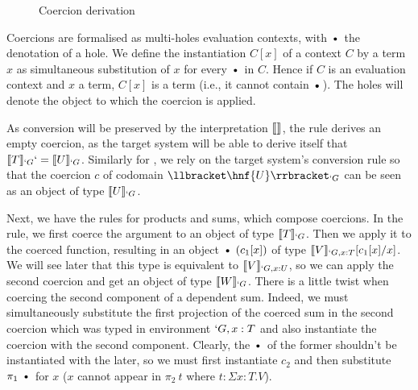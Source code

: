 \documentclass{llncs}
\begin{document}
\begin{figure}[ht]
  \subtisc
  \caption{Coercion derivation}
  \label{fig:coerce-impl-rules-short}
\end{figure}

Coercions are formalised as multi-holes evaluation contexts, with
$\ctxdot$ the denotation of a hole. We define the instantiation $C[x]$ of a context $C$
by a term $x$ as simultaneous substitution of $x$ for every $\ctxdot$ in $C$.
Hence if $C$ is an evaluation context and $x$ a term, $C[x]$ is a term
(i.e., it cannot contain $\ctxdot$).
The holes will denote the object to which the coercion is applied.

As conversion will be preserved by the interpretation $\llbracket  \rrbracket_{}$,
the rule  derives an empty coercion, as the target system
will be able to derive itself that $\llbracket T \rrbracket_{`G} `= \llbracket U \rrbracket_{`G}$.
Similarly for , we rely on the target system's conversion
rule so that the coercion $c$ of codomain $\ip{\hnf{U}}{`G}$ can be seen
as an object of type $\llbracket U \rrbracket_{`G}$.

Next, we have the rules for products and sums, which compose
coercions. In the  rule, we first coerce the argument to
an object of type $\llbracket T \rrbracket_{`G}$. Then we apply it to the coerced
function, resulting in an object $\ctxdot~(c_1[x])$ of type
$\llbracket V \rrbracket_{`G, x : T}[c_1[x]/x]$. We will see later that this type is equivalent to
$\llbracket V \rrbracket_{`G, x : U}$, so we can apply the second coercion and get an
object of type $\llbracket W \rrbracket_{`G}$. There is a little twist when coercing the
second component of a dependent sum. Indeed, we must simultaneously
substitute the first projection of the coerced sum in the second
coercion which was typed in environment $`G, x : T$ and also instantiate
the coercion with the second component. Clearly, the $\ctxdot$ of the
former shouldn't be instantiated with the later, so we must first
instantiate $c_2$ and then substitute $\pi_1~\ctxdot$ for $x$ 
($x$ cannot appear in $\pi_2~t$ where $t : \Sigma x : T.V$).
\end{document}
